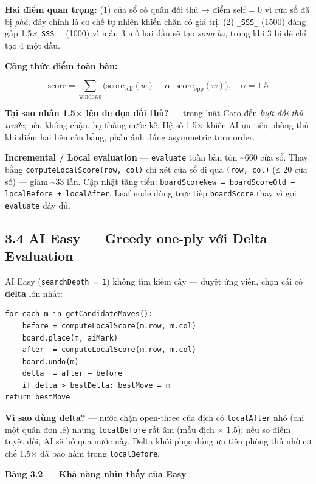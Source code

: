 \documentclass[11pt,a4paper]{article}
\begin{document}
\textbf{Hai điểm quan trọng:} (1) cửa sổ có quân đối thủ → điểm self = 0 vì cửa sổ đã bị \emph{phá}; đây chính là cơ chế tự nhiên khiến chặn có giá trị. (2) \texttt{\_SSS\_} (1500) đáng gấp 1.5× \texttt{SSS\_\_} (1000) vì mẫu 3 mở hai đầu sẽ tạo \emph{song ba}, trong khi 3 bị đè chỉ tạo 4 một đầu.

\textbf{Công thức điểm toàn bàn:}

$$
\text{score} = \sum_{\text{windows}} \Big( \text{score}_{\text{self}}(w) - \alpha \cdot \text{score}_{\text{opp}}(w) \Big),\quad \alpha = 1.5
$$

\textbf{Tại sao nhân 1.5× lên đe dọa đối thủ?} — trong luật Caro đến \emph{lượt đối thủ trước}; nếu không chặn, họ thắng nước kế. Hệ số 1.5× khiến AI ưu tiên phòng thủ khi điểm hai bên cân bằng, phản ánh đúng asymmetric turn order.

\textbf{Incremental / Local evaluation} — \texttt{evaluate} toàn bàn tốn \textasciitilde{}660 cửa sổ. Thay bằng \texttt{computeLocalScore(row, col)} chỉ xét cửa sổ đi qua \texttt{(row, col)} (≤ 20 cửa sổ) — giảm \textasciitilde{}33 lần. Cập nhật tăng tiến: \texttt{boardScoreNew = boardScoreOld − localBefore + localAfter}. Leaf node dùng trực tiếp \texttt{boardScore} thay vì gọi \texttt{evaluate} đầy đủ.
\subsection{3.4 AI Easy — Greedy one-ply với Delta Evaluation}
\label{sec:org51bc04c}

AI Easy (\texttt{searchDepth = 1}) không tìm kiếm cây — duyệt ứng viên, chọn cái có \textbf{delta} lớn nhất:

\begin{verbatim}
for each m in getCandidateMoves():
    before = computeLocalScore(m.row, m.col)
    board.place(m, aiMark)
    after  = computeLocalScore(m.row, m.col)
    board.undo(m)
    delta  = after − before
    if delta > bestDelta: bestMove = m
return bestMove
\end{verbatim}

\textbf{Vì sao dùng delta?} — nước chặn open-three của địch có \texttt{localAfter} nhỏ (chỉ một quân đơn lẻ) nhưng \texttt{localBefore} rất âm (mẫu địch × 1.5); nếu so điểm tuyệt đối, AI sẽ bỏ qua nước này. Delta khôi phục đúng ưu tiên phòng thủ nhờ cơ chế 1.5× đã bao hàm trong \texttt{localBefore}.

\textbf{Bảng 3.2 — Khả năng nhìn thấy của Easy}
\end{document}
